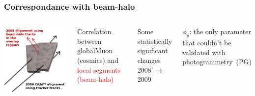 \documentclass[compress]{beamer}
\begin{document}
\begin{frame}
\frametitle{Correspondance with beam-halo}

\vspace{0.5 cm}
\begin{columns}
\includegraphics[width=\linewidth]{csc_alignments.png}

\scriptsize
Correlation between globalMuon (cosmics) and \textcolor{red}{local segments (beam-halo)}

\vspace{0.2 cm}
Some statistically significant changes \\ 2008 $\to$ 2009

\vspace{0.2 cm}
$\phi_y$: the only parameter that couldn't be validated with \mbox{photogrammetry (PG)\hspace{-1 cm}}


\end{columns}
\end{frame}
\end{document}
